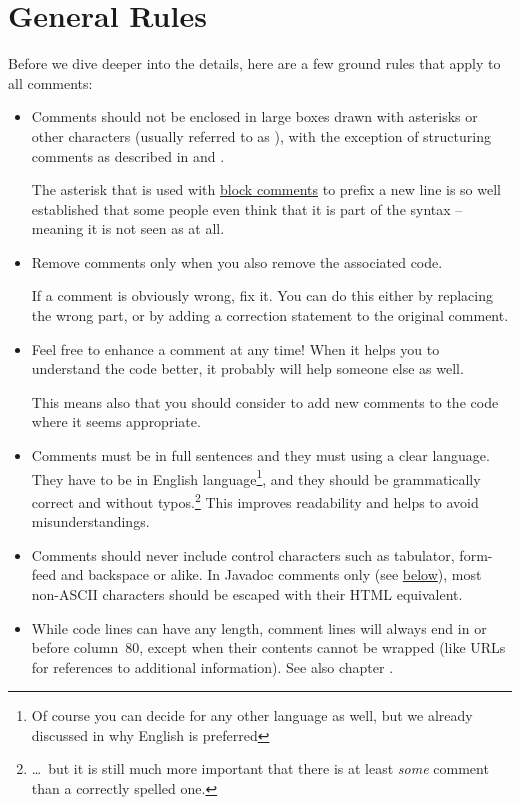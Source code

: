\section{General Rules}\label{sec:CommentsGeneralRules}
Before we dive deeper into the details, here are a few ground rules that apply to all comments:
\begin{itemize}
	\item{Comments should not be enclosed in large boxes drawn with asterisks or other characters (usually referred to as ), with the exception of structuring comments as described in  and .
	
	The asterisk that is used with \hyperref[sec:BlockComments]{block comments} to prefix a new line is so well established that some people even think that it is part of the syntax – meaning it is not seen as  at all.}
	
	\item{Remove comments only when you also remove the associated code.
	
	If a comment is obviously wrong, fix it. You can do this either by replacing the wrong part, or by adding a correction statement to the original comment.}
	
	\item{Feel free to enhance a comment at any time! When it helps you to understand the code better, it probably will help someone else as well.
	
	This means also that you should consider to add new comments to the code where it seems appropriate.}
	
	\item{Comments must be in full sentences and they must using a clear language. They have to be in English language\footnote{Of course you can decide for any other language as well, but we already discussed in  why English is preferred}, and they should be grammatically correct and without typos.\footnote{…~but it is still much more important that there is at least \textit{some} comment than a correctly spelled one.} This improves readability and helps to avoid misunderstandings.}

	\item{Comments should never include control characters such as tabulator, form-feed and backspace or alike. In Javadoc comments only (see \hyperref[sec:DocumentationComments]{below}), most non-ASCII characters should be escaped with their HTML equivalent.}

	\item{While code lines can have any length, comment lines will always end in or before column~80, except when their contents cannot be wrapped (like URLs for references to additional information). See also chapter .}
\end{itemize}

